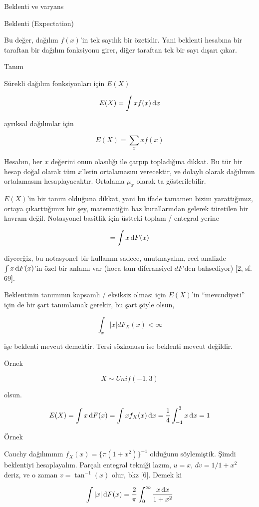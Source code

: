 \documentclass[12pt,fleqn]{article}\usepackage{../../common}
\begin{document}
Beklenti ve varyans

Beklenti (Expectation) 

Bu değer, dağılım $f(x)$'in tek sayılık bir özetidir. Yani beklenti hesabına
bir taraftan bir dağılım fonksiyonu girer, diğer taraftan tek bir sayı
dışarı çıkar. 

Tanım

Sürekli dağılım fonksiyonları için $E(X)$

$$  E(X) = \int x f(x) \,\mathrm{d} x$$

ayrıksal dağılımlar için

$$ E(X) = \sum_x xf(x) $$

Hesabın, her $x$ değerini onun olasılığı ile çarpıp topladığına dikkat. Bu
tür bir hesap doğal olarak tüm $x$'lerin ortalamasını verecektir, ve
dolaylı olarak dağılımın ortalamasını hesaplayacaktır. Ortalama $\mu_x$
olarak ta gösterilebilir.

$E(X)$'in bir tanım olduğuna dikkat, yani bu ifade tamamen bizim
yarattığımız, ortaya çıkarttığımız bir şey, matematiğin baz kurallarından
gelerek türetilen bir kavram değil. Notasyonel basitlik için üstteki toplam
/ entegral yerine

$$ = \int x \,\mathrm{d} F(x) $$

diyeceğiz, bu notasyonel bir kullanım sadece, unutmayalım, reel analizde
$\int x \,\mathrm{d} F(x)$'in özel bir anlamı var (hoca tam diferansiyel $dF$'den
bahsediyor) [2, sf. 69]. 

Beklentinin tanımının kapsamlı / eksiksiz olması için $E(X)$'in
``mevcudiyeti'' için de bir şart tanımlamak gerekir, bu şart şöyle olsun, 

$$ \int_x |x|dF_X(x) < \infty $$

işe beklenti mevcut demektir. Tersi sözkonusu ise beklenti mevcut
değildir. 

Örnek 

$$
X \sim Unif(-1,3)
$$

olsun.

$$
E(X) = \int x \,\mathrm{d} F(x) = \int x f_X(x) \,\mathrm{d} x
= \frac{1}{4} \int _{ -1}^{3} x \,\mathrm{d} x = 1
$$

Örnek 

Cauchy dağılımının $f_X(x) = \{ \pi (1+x^2) \} ^{-1}$ olduğunu
söylemiştik. Şimdi beklentiyi hesaplayalım. Parçalı entegral tekniği lazım,
$u=x$, $dv = 1/1+x^2$ deriz, ve o zaman $v = \tan ^{-1}(x)$ olur, bkz
[6]. Demek ki

$$
\int |x| \,\mathrm{d} F(x)
= \frac{ 2}{\pi} \int _{ 0}^{\infty}\frac{x \,\mathrm{d} x}{1+x^2}
$$
\end{document}
